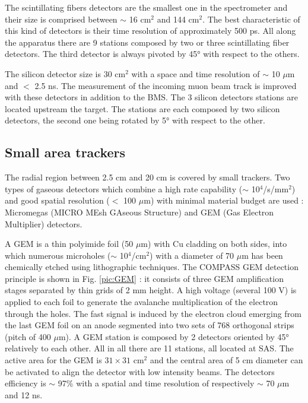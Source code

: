 The scintillating fibers detectors are the smallest one in the spectrometer and their size is comprised between $\sim$ 16 cm$^2$
and 144 cm$^2$. The best characteristic of this kind of detectors is their time resolution of approximately 500 ps. All along the
apparatus there are 9 stations composed by two or three scintillating fiber detectors. The third detector is always pivoted by 45°
with respect to the others.

The silicon detector size is 30 cm$^2$ with a space and time resolution of $\sim$ 10 $\mu$m and $<$ 2.5 ns. The measurement
of the incoming muon beam track is improved with these detectors in addition to the BMS. The 3 silicon detectors stations are
located upstream the target. The stations are each composed by two silicon detectors, the second one being rotated by 5° with
respect to the other.

\subsection{Small area trackers}

The radial region between 2.5 cm and 20 cm is covered by small trackers. Two types of gaseous detectors which combine a high rate capability ($\sim$ 10$^4$/s/mm$^2$) and good spatial resolution ($<$ 100 $\mu$m) with minimal material budget are used : Micromegas (MICRO MEsh GAseous Structure) and GEM (Gas Electron Multiplier) detectors.

A GEM is a thin polyimide foil (50 $\mu$m) with Cu cladding on both sides, into which numerous microholes ($\sim$ 10$^4$/cm$^2$) with a diameter of 70 $\mu$m has been chemically etched using lithographic techniques. The COMPASS GEM detection principle is shown in Fig. \ref{pic:GEM} : it consists of three GEM amplification stages separated by thin grids of 2 mm height. A high voltage (several 100 V) is applied to each foil to generate the avalanche multiplication of the electron through the holes. The fast signal is induced by the electron cloud emerging from the last GEM foil on an anode segmented into two sets of 768 orthogonal strips (pitch of 400 $\mu$m). A GEM station is composed by 2 detectors oriented by 45° relatively to each other. All in all there are 11 stations, all located at SAS. The active area for the GEM is $31 \times 31$ cm$^2$ and the central area of 5 cm diameter can be activated to align the detector with low intensity beams. The detectors efficiency is $\sim$ 97\% with a spatial and time resolution of respectively $\sim$ 70 $\mu$m and 12 ns.

